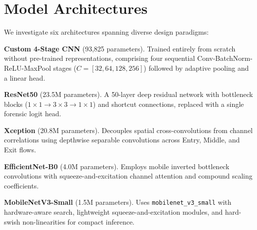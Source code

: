 \documentclass[conference]{IEEEtran}
\begin{document}
\begin{table}[!t]
\caption{Verified FaceForensics++ C23 Partition Statistics under Graph-Connected Identity-Disjoint Splitting.}
\label{tab:dataset_splits}
\centering
{}
\end{table}


\section{Model Architectures}
\label{sec:architectures}

We investigate six architectures spanning diverse design paradigms:

\textbf{Custom 4-Stage CNN} (93,825 parameters). Trained entirely from scratch without pre-trained representations, comprising four sequential Conv-BatchNorm-ReLU-MaxPool stages ($C = [32, 64, 128, 256]$) followed by adaptive pooling and a linear head.

\textbf{ResNet50} \cite{he2016resnet} (23.5M parameters). A 50-layer deep residual network with bottleneck blocks ($1{\times}1 \to 3{\times}3 \to 1{\times}1$) and shortcut connections, replaced with a single forensic logit head.

\textbf{Xception} \cite{chollet2017xception} (20.8M parameters). Decouples spatial cross-convolutions from channel correlations using depthwise separable convolutions across Entry, Middle, and Exit flows.

\textbf{EfficientNet-B0} (4.0M parameters). Employs mobile inverted bottleneck convolutions with squeeze-and-excitation channel attention and compound scaling coefficients.

\textbf{MobileNetV3-Small} (1.5M parameters). Uses \texttt{mobilenet\_v3\_small} with hardware-aware search, lightweight squeeze-and-excitation modules, and hard-swish non-linearities for compact inference.
\end{document}
